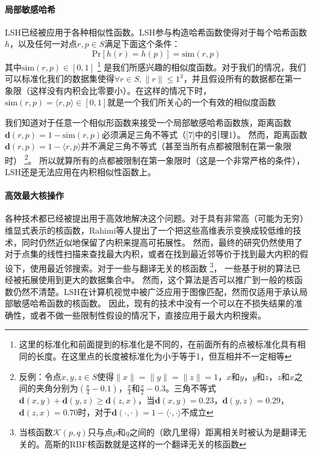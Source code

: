 \documentclass[twocolumn,a4paper]{article}
\begin{document}
\paragraph{局部敏感哈希}LSH已经被应用于各种相似性函数。LSH参与构造哈希函数使得对于每个哈希函数$h$，以及任何一对点$r,p \in S$满足下面这个条件：
\begin{equation}
\mathrm{Pr}[h(r) = h(p)] = \mathrm{sim}(r,p)
\end{equation}
其中$\mathrm{sim}(r,p) \in [0,1]$
\footnote{这里的标准化和前面提到的标准化是不同的，在前面所有的点被标准化具有相同的长度。在这里点的长度被标准化为小于等于1，但互相并不一定相等}
是我们所感兴趣的相似度函数。对于我们的情况，我们可以标准化我们的数据集使得$\forall r \in S, \|r\| \le 1^3$，并且假设所有的数据都在第一象限（这样没有内积会比零要小）。在这样的情况下时，$\mathrm{sim}(r,p) = \langle r,p \rangle \in [0,1]$就是一个我们所关心的一个有效的相似度函数

我们知道对于任意一个相似形函数来接受一个局部敏感哈希函数族，距离函数$\mathbf{d}(r,p) = 1 - \mathrm{sim}(r,p)$必须满足三角不等式（[7]中的引理1）。
然而，距离函数$\mathbf{d}(r, p) = 1 - \langle r,p \rangle$并不满足三角不等式（甚至当所有点都被限制在第一象限时）
\footnote{反例：令点$x,y,z\in S$使得$\|x\|=\|y\|=\|z\|=1$，$x$和$y$，$y$和$z$，$z$和$x$之间的夹角分别为$\left(\frac{\pi}{4} - 0.1\right)$，$\frac{\pi}{4}$和$\frac{\pi}{2} - 0.3$。三角不等式$\mathbf{d}(x,y)+\mathbf{d}(y,z)\ge\mathbf{d}(z,x)$，当$\mathbf{d}(x,y) = 0.23$，$\mathbf{d}(y,z)=0.29$，$\mathbf{d}(z,x)=0.70$时，对于$\mathbf{d}(\cdot,\cdot)=1-\langle \cdot,\cdot \rangle$不成立}。
所以就算所有的点都被限制在第一象限时（这是一个非常严格的条件），LSH还是无法应用在内积相似性函数上。

\paragraph{高效最大核操作}各种技术都已经被提出用于高效地解决这个问题。对于具有非常高（可能为无穷）维显式表示的核函数，Rahimi等人提出了一个把这些高维表示变换成较低维的技术，同时仍然近似地保留了内积来提高可拓展性。
然而，最终的研究仍然使用了对于点集的线性扫描来查找最大内积，或者在找到最近邻等价于找到最大内积的假设下，使用最近邻搜索。对于一些与翻译无关的核函数
\footnote{当核函数$\mathcal{K}(p,q)$只与点$p$和$q$之间的（欧几里得）距离相关时被认为是翻译无关的。高斯的RBF核函数就是这样的一个翻译无关的核函数}，
一些基于树的算法已经被拓展使用到更大的数据集合中。
然而，这个算法是否可以推广到一般的核函数仍然不清楚。LSH在计算机视觉中被广泛应用于图像匹配，然而仅适用于承认局部敏感哈希函数的核函数。
因此，现有的技术中没有一个可以在不损失结果的准确性，或者不做一些限制性假设的情况下，直接应用于最大内积搜索。
\end{document}
